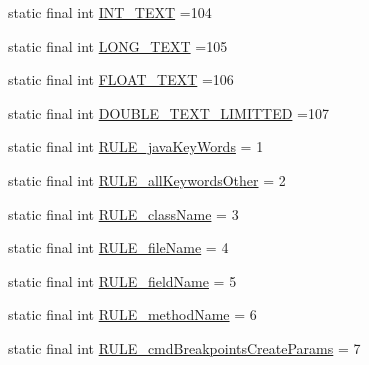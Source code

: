 \begin{DoxyCompactItemize}
static final int \hyperlink{classgov_1_1nasa_1_1jpf_1_1inspector_1_1server_1_1expression_1_1parser_1_1_expression_grammar_parser_a7223ce7489ade7bbb552f89fc4d6e555}{I\+N\+T\+\_\+\+T\+E\+XT} =104
\item 
static final int \hyperlink{classgov_1_1nasa_1_1jpf_1_1inspector_1_1server_1_1expression_1_1parser_1_1_expression_grammar_parser_ae069bf95cf11e44cb3546519a44679ce}{L\+O\+N\+G\+\_\+\+T\+E\+XT} =105
\item 
static final int \hyperlink{classgov_1_1nasa_1_1jpf_1_1inspector_1_1server_1_1expression_1_1parser_1_1_expression_grammar_parser_ad1fd03c70bd089f786f32829dcd53e03}{F\+L\+O\+A\+T\+\_\+\+T\+E\+XT} =106
\item 
static final int \hyperlink{classgov_1_1nasa_1_1jpf_1_1inspector_1_1server_1_1expression_1_1parser_1_1_expression_grammar_parser_a68673c70894625a52edf0c22579e7f01}{D\+O\+U\+B\+L\+E\+\_\+\+T\+E\+X\+T\+\_\+\+L\+I\+M\+I\+T\+T\+ED} =107
\item 
static final int \hyperlink{classgov_1_1nasa_1_1jpf_1_1inspector_1_1server_1_1expression_1_1parser_1_1_expression_grammar_parser_a42e4d42cc0f955f8c1a4bc2e289add44}{R\+U\+L\+E\+\_\+java\+Key\+Words} = 1
\item 
static final int \hyperlink{classgov_1_1nasa_1_1jpf_1_1inspector_1_1server_1_1expression_1_1parser_1_1_expression_grammar_parser_a4cd43289939dc731de4296998b2be832}{R\+U\+L\+E\+\_\+all\+Keywords\+Other} = 2
\item 
static final int \hyperlink{classgov_1_1nasa_1_1jpf_1_1inspector_1_1server_1_1expression_1_1parser_1_1_expression_grammar_parser_aaf27fecc6466adc6988000be8b8ee452}{R\+U\+L\+E\+\_\+class\+Name} = 3
\item 
static final int \hyperlink{classgov_1_1nasa_1_1jpf_1_1inspector_1_1server_1_1expression_1_1parser_1_1_expression_grammar_parser_aaebd45e7b8e63c8756b0ce585c575dfc}{R\+U\+L\+E\+\_\+file\+Name} = 4
\item 
static final int \hyperlink{classgov_1_1nasa_1_1jpf_1_1inspector_1_1server_1_1expression_1_1parser_1_1_expression_grammar_parser_a3fdbd5716b17e52ee9b8597995cd3647}{R\+U\+L\+E\+\_\+field\+Name} = 5
\item 
static final int \hyperlink{classgov_1_1nasa_1_1jpf_1_1inspector_1_1server_1_1expression_1_1parser_1_1_expression_grammar_parser_a9797bb55223a9ee290076d6e4c46a9a9}{R\+U\+L\+E\+\_\+method\+Name} = 6
\item 
static final int \hyperlink{classgov_1_1nasa_1_1jpf_1_1inspector_1_1server_1_1expression_1_1parser_1_1_expression_grammar_parser_a0303cdd38ece8fc7222bda462c0be691}{R\+U\+L\+E\+\_\+cmd\+Breakpoints\+Create\+Params} = 7

\end{DoxyCompactItemize}
